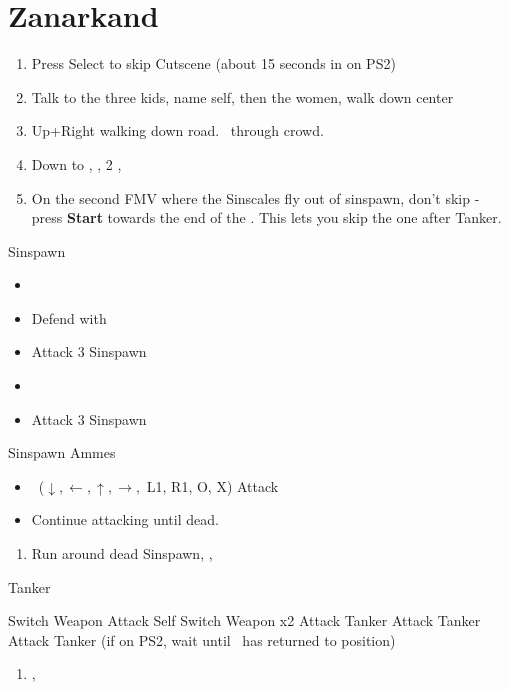 \chapter{Zanarkand}

\begin{enumerate}
    \item Press Select to skip Cutscene (about 15 seconds in on PS2)
    \item Talk to the three kids, name self, then the women, walk down center
    \item Up+Right walking down road. \sd\ through crowd. \skippablefmv[2:30]
    \item Down to \auron, \sd, 2 \skippablefmv[2:30], \sd
    \item On the second FMV where the Sinscales fly out of sinspawn, don't skip - press \textbf{Start} towards the end of the \fmv. This lets you skip the one after Tanker.
\end{enumerate}
\begin{battle}{Sinspawn}
    \begin{itemize}
        \item \sd
        \item Defend with \tidus
        \item Attack 3 Sinspawn
        \item \sd
        \item Attack 3 Sinspawn
    \end{itemize}
\end{battle}
\begin{battle}[2400]{Sinspawn Ammes}
    \begin{itemize}
        \item \sd
        \auronf \od\ ($\downarrow, \leftarrow, \uparrow, \rightarrow,$ L1, R1, O, X)
        \tidusf Attack
        \tidusf \od
        \item Continue attacking until dead.
    \end{itemize}
\end{battle}
\begin{enumerate}[resume]
    \item Run around dead Sinspawn, \save, \sd
\end{enumerate}
\begin{battle}[1000]{Tanker}
    \begin{itemize}
        \tidusf Switch Weapon
        \auronf Attack Self
        \tidusf Switch Weapon x2
        \tidusf Attack Tanker
        \auronf Attack Tanker
        \tidusf Attack Tanker (if on PS2, wait until \auron\ has returned to position)
    \end{itemize}
\end{battle}
\begin{enumerate}[resume]
    \item \cs[2:00], \skippablefmv
\end{enumerate}
